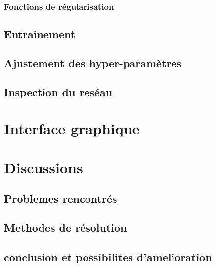 \documentclass[11pt]{article}
\begin{document}
\subsubsection{Fonctions de r\'egularisation}

\subsection{Entrainement}

\subsection{Ajustement des hyper-param\`etres}

\subsection{Inspection du res\'eau}

\section{Interface graphique}



\section{Discussions}
\subsection{Problemes rencontr\'es}
\subsection{Methodes de r\'esolution}
\subsection{conclusion et possibilites d'amelioration}
\end{document}

